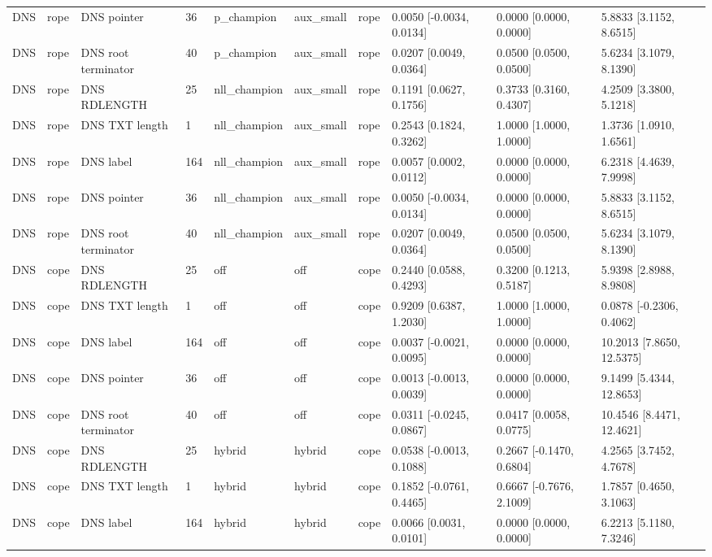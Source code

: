 \begin{tabular}{llllllllll}
DNS & rope & DNS pointer & 36 & p\_champion & aux\_small & rope & 0.0050 [-0.0034, 0.0134] & 0.0000 [0.0000, 0.0000] & 5.8833 [3.1152, 8.6515] \\
DNS & rope & DNS root terminator & 40 & p\_champion & aux\_small & rope & 0.0207 [0.0049, 0.0364] & 0.0500 [0.0500, 0.0500] & 5.6234 [3.1079, 8.1390] \\
DNS & rope & DNS RDLENGTH & 25 & nll\_champion & aux\_small & rope & 0.1191 [0.0627, 0.1756] & 0.3733 [0.3160, 0.4307] & 4.2509 [3.3800, 5.1218] \\
DNS & rope & DNS TXT length & 1 & nll\_champion & aux\_small & rope & 0.2543 [0.1824, 0.3262] & 1.0000 [1.0000, 1.0000] & 1.3736 [1.0910, 1.6561] \\
DNS & rope & DNS label & 164 & nll\_champion & aux\_small & rope & 0.0057 [0.0002, 0.0112] & 0.0000 [0.0000, 0.0000] & 6.2318 [4.4639, 7.9998] \\
DNS & rope & DNS pointer & 36 & nll\_champion & aux\_small & rope & 0.0050 [-0.0034, 0.0134] & 0.0000 [0.0000, 0.0000] & 5.8833 [3.1152, 8.6515] \\
DNS & rope & DNS root terminator & 40 & nll\_champion & aux\_small & rope & 0.0207 [0.0049, 0.0364] & 0.0500 [0.0500, 0.0500] & 5.6234 [3.1079, 8.1390] \\
DNS & cope & DNS RDLENGTH & 25 & off & off & cope & 0.2440 [0.0588, 0.4293] & 0.3200 [0.1213, 0.5187] & 5.9398 [2.8988, 8.9808] \\
DNS & cope & DNS TXT length & 1 & off & off & cope & 0.9209 [0.6387, 1.2030] & 1.0000 [1.0000, 1.0000] & 0.0878 [-0.2306, 0.4062] \\
DNS & cope & DNS label & 164 & off & off & cope & 0.0037 [-0.0021, 0.0095] & 0.0000 [0.0000, 0.0000] & 10.2013 [7.8650, 12.5375] \\
DNS & cope & DNS pointer & 36 & off & off & cope & 0.0013 [-0.0013, 0.0039] & 0.0000 [0.0000, 0.0000] & 9.1499 [5.4344, 12.8653] \\
DNS & cope & DNS root terminator & 40 & off & off & cope & 0.0311 [-0.0245, 0.0867] & 0.0417 [0.0058, 0.0775] & 10.4546 [8.4471, 12.4621] \\
DNS & cope & DNS RDLENGTH & 25 & hybrid & hybrid & cope & 0.0538 [-0.0013, 0.1088] & 0.2667 [-0.1470, 0.6804] & 4.2565 [3.7452, 4.7678] \\
DNS & cope & DNS TXT length & 1 & hybrid & hybrid & cope & 0.1852 [-0.0761, 0.4465] & 0.6667 [-0.7676, 2.1009] & 1.7857 [0.4650, 3.1063] \\
DNS & cope & DNS label & 164 & hybrid & hybrid & cope & 0.0066 [0.0031, 0.0101] & 0.0000 [0.0000, 0.0000] & 6.2213 [5.1180, 7.3246] \\

\end{tabular}
